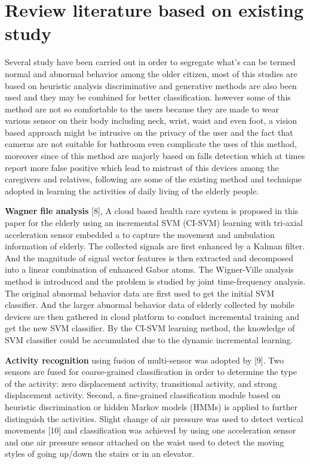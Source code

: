 \documentclass[a4paper, parskip=full]{scrartcl}
\begin{document}
\section*{Review literature based on existing study}

Several study have been carried out in order to segregate what’s can be termed normal and abnormal behavior among the older citizen, most of this studies are based on heuristic analysis discriminative and generative methods are also been used and they may be combined for better classification. however some of this method are not so comfortable to the users because they are made to wear various sensor on their body including neck, wrist, waist and even foot, a vision based approach might be intrusive on the privacy of the user and the fact that cameras are not suitable for bathroom even complicate the uses of this method, moreover since of this method are majorly based on falls detection which at times report more false positive which lead to mistrust of this devices among the caregivers and relatives, following are some of the existing method and technique adopted in learning the activities of daily living of the elderly people.

\textbf{Wagner file analysis} [8], A cloud based health care system is proposed in this paper for the elderly using an incremental SVM (CI-SVM) learning with tri-axial acceleration sensor embedded a to capture the movement and ambulation information of elderly. The collected signals are first enhanced by a Kalman filter. And the magnitude of signal vector features is then extracted and decomposed into a linear combination of enhanced Gabor atoms. The Wigner-Ville analysis method is introduced and the problem is studied by joint time-frequency analysis. The original abnormal behavior data are first used to get the initial SVM classifier. And the larger abnormal behavior data of elderly collected by mobile devices are then gathered in cloud platform to conduct incremental training and get the new SVM classifier. By the CI-SVM learning method, the knowledge of SVM classifier could be accumulated due to the dynamic incremental learning. 

\textbf{Activity recognition} using fusion of multi-sensor was adopted by [9].  Two sensors are fused for coarse-grained classification in order to determine the type of the activity: zero displacement activity, transitional activity, and strong displacement activity. Second, a fine-grained classification module based on heuristic discrimination or hidden Markov models (HMMs) is applied to further distinguish the activities. Slight change of air pressure was used to detect vertical movements [10] and classification was achieved by using one acceleration sensor and one air pressure sensor attached on the waist used to detect the moving styles of going up/down the stairs or in an elevator.
\end{document}

